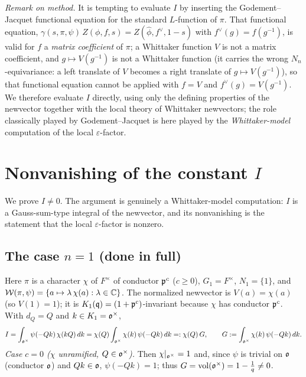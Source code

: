 \medskip
\noindent\emph{Remark on method.} It is tempting to evaluate $I$ by inserting the
Godement--Jacquet functional equation for the standard $L$-function of $\pi$. That functional
equation, $\gamma(s,\pi,\psi)\,Z(\phi,f,s)=Z(\widehat\phi,f^\vee,1-s)$ with
$f^\vee(g)=f(g^{-1})$, is valid for $f$ a \emph{matrix coefficient} of $\pi$; a Whittaker
function $V$ is not a matrix coefficient, and $g\mapsto V(g^{-1})$ is not a Whittaker function
\textup{(}it carries the wrong $N_n$-equivariance: a left translate of $V$ becomes a right
translate of $g\mapsto V(g^{-1})$\textup{)}, so that functional equation cannot be applied with
$f=V$ and $f^\vee(g)=V(g^{-1})$. We therefore evaluate $I$ directly, using only the defining
properties of the newvector together with the local theory of Whittaker newvectors; the role
classically played by Godement--Jacquet is here played by the \emph{Whittaker-model} computation
of the local $\varepsilon$-factor.

\section*{Nonvanishing of the constant $I$}

We prove $I\neq0$. The argument is genuinely a Whittaker-model computation: $I$ is a
Gauss-sum-type integral of the newvector, and its nonvanishing is the statement that the local
$\varepsilon$-factor is nonzero.

\subsection*{The case $n=1$ \textup{(}done in full\textup{)}}
Here $\pi$ is a character $\chi$ of $F^\times$ of conductor $\mathfrak{p}^{c}$ \textup{(}$c\ge0$\textup{)},
$G_1=F^\times$, $N_1=\{1\}$, and $\mathcal{W}(\pi,\psi)=\{a\mapsto \lambda\,\chi(a):\lambda\in\mathbb{C}\}$.
The normalized newvector is $V(a)=\chi(a)$ \textup{(}so $V(1)=1$\textup{)}; it is
$K_1(\mathfrak{q})=(1+\mathfrak{p}^{c})$-invariant because $\chi$ has conductor $\mathfrak{p}^{c}$. With
$d_Q=Q$ and $k\in K_1=\mathfrak{o}^\times$,
\[
I=\int_{\mathfrak{o}^\times}\psi(-Q k)\,\chi(kQ)\,dk
=\chi(Q)\int_{\mathfrak{o}^\times}\chi(k)\,\psi(-Q k)\,dk
=:\chi(Q)\,G,\qquad G:=\int_{\mathfrak{o}^\times}\chi(k)\,\psi(-Q k)\,dk .
\]
\emph{Case $c=0$ \textup{(}$\chi$ unramified, $Q\in\mathfrak{o}^\times$\textup{)}.} Then
$\chi|_{\mathfrak{o}^\times}=1$ and, since $\psi$ is trivial on $\mathfrak{o}$ \textup{(}conductor
$\mathfrak{o}$\textup{)} and $Qk\in\mathfrak{o}$, $\psi(-Qk)=1$; thus
$G=\operatorname{vol}(\mathfrak{o}^\times)=1-\tfrac1q\neq0$.

